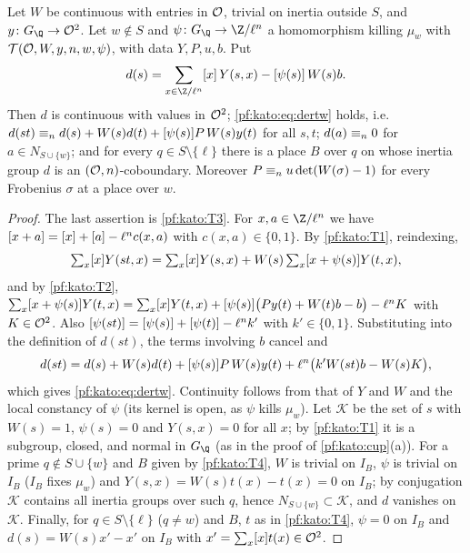 \begin{lemma}\label{pf:kato:der}
Let $W$ be continuous with entries in $\mathcal{O}$, trivial on inertia outside $S$, and $y\colon G_\Q\to\katoO^2$. Let $w\notin S$ and
$\psi\colon G_\Q\to\Z/\ell^n$ a homomorphism killing $\mu_w$ with $\mathcal{T}(\mathcal{O},W,y,n,w,\psi)$, with data $Y,P,u,b$. Put
\[
  d(s)=\sum_{x\in\Z/\ell^n}\katorep{x}\,Y(s,x)-\katorep{\psi(s)}\,W(s)b .
\]
Then $d$ is continuous with values in $\mathcal{O}^2$;
\eqref{pf:kato:eq:dertw} holds, i.e.\ $d(st)\equiv_{n}d(s)+W(s)d(t)+[\psi(s)]P\,W(s)y(t)$ for all $s,t$;
$d(a)\equiv_{n}0$ for $a\in N_{S\cup\{w\}}$; and for every $q\in S\setminus\{\ell\}$ there is a place $B$ over $q$ on whose inertia
group $d$ is an $(\mathcal{O},n)$-coboundary. Moreover $P\equiv_{n}u\det(W(\sigma)-1)$ for every Frobenius $\sigma$ at a place over $w$.
\end{lemma}

\begin{proof}
The last assertion is \ref{pf:kato:T3}. For $x,a\in\Z/\ell^n$ we have $[x+a]=[x]+[a]-\ell^nc(x,a)$ with
$c(x,a)\in\{0,1\}$. By \ref{pf:kato:T1}, reindexing,
\[
\textstyle\sum_x[x]Y(st,x)=\sum_x[x]Y(s,x)+W(s)\sum_x[x+\psi(s)]Y(t,x),
\]
and by \ref{pf:kato:T2}, $\sum_x[x+\psi(s)]Y(t,x)=\sum_x[x]Y(t,x)+[\psi(s)]\bigl(Py(t)+W(t)b-b\bigr)-\ell^nK$ with
$K\in\mathcal{O}^2$. Also $[\psi(st)]=[\psi(s)]+[\psi(t)]-\ell^nk'$ with $k'\in\{0,1\}$. Substituting into the definition
of $d(st)$, the terms involving $b$ cancel and
\[
d(st)=d(s)+W(s)d(t)+[\psi(s)]P\,W(s)y(t)+\ell^n\bigl(k'W(st)b-W(s)K\bigr),
\]
which gives \eqref{pf:kato:eq:dertw}. Continuity follows from that of $Y$ and $W$ and the local constancy of $\psi$ (its kernel
is open, as $\psi$ kills $\mu_w$). Let $\mathcal K$ be the set of $s$ with $W(s)=1$, $\psi(s)=0$ and $Y(s,x)=0$ for all $x$; by
\ref{pf:kato:T1} it is a subgroup, closed, and normal in $G_\Q$ (as in the proof of \cref{pf:kato:cup}(a)). For a prime
$q\notin S\cup\{w\}$ and $B$ given by \ref{pf:kato:T4}, $W$ is trivial on $I_B$, $\psi$ is trivial on $I_B$ ($I_B$ fixes $\mu_w$) and
$Y(s,x)=W(s)t(x)-t(x)=0$ on $I_B$; by conjugation $\mathcal K$ contains all inertia groups over such $q$, hence
$N_{S\cup\{w\}}\subset\mathcal K$, and $d$ vanishes on $\mathcal K$. Finally, for $q\in S\setminus\{\ell\}$ ($q\ne w$) and $B$, $t$ as in
\ref{pf:kato:T4}, $\psi=0$ on $I_B$ and $d(s)=W(s)x'-x'$ on $I_B$ with $x'=\sum_x[x]t(x)\in\mathcal{O}^2$.
\end{proof}

